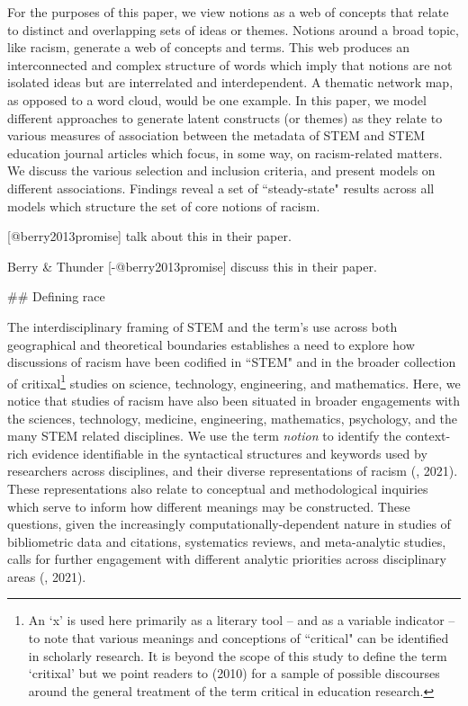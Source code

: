 {{For the purposes of this paper, we view notions as a web of concepts that relate to distinct and overlapping sets of ideas or themes. Notions around a broad topic, like racism, generate a web of concepts and terms. This web produces an interconnected and complex structure of words which imply that notions are not isolated ideas but are interrelated and interdependent. A thematic network map, as opposed to a word cloud, would be one example. In this paper, we model different approaches to generate latent constructs (or themes) as they relate to various measures of association between the metadata of STEM and STEM education journal articles which focus, in some way, on racism-related matters. We discuss the various selection and inclusion criteria, and present models on different associations. Findings reveal a set of ``steady-state" results across all models which structure the set of core notions of racism.

[@berry2013promise] talk about this in their paper.

Berry & Thunder [-@berry2013promise] discuss this in their paper.



## Defining race

The interdisciplinary framing of STEM and the term's use across both geographical and theoretical boundaries establishes a need to explore how discussions of racism have been codified in ``STEM" and in the broader collection of critixal\footnote{An `x' is used here primarily as a literary tool -- and as a variable indicator -- to note that various meanings and conceptions of ``critical" can be identified in scholarly research. It is beyond the scope of this study to define the term `critixal' but we point readers to \cite{apple2010theory} (2010) for a sample of possible discourses around the general treatment of the term critical in education research.} studies on science, technology, engineering, and mathematics. Here, we notice that studies of racism have also been situated in broader engagements with the sciences, technology, medicine, engineering, mathematics, psychology, and the many STEM related disciplines. We use the term \textit{notion} to identify the context-rich evidence identifiable in the syntactical structures and keywords used by researchers across disciplines, and their diverse representations of racism (\cite{bonilla2021}, 2021). These representations also relate to conceptual and methodological inquiries which serve to inform how different meanings may be constructed. These questions, given the increasingly computationally-dependent nature in studies of bibliometric data and citations, systematics reviews, and meta-analytic studies, calls for further engagement with  different analytic priorities across disciplinary areas (\cite{shiao2021}, 2021).

}}
